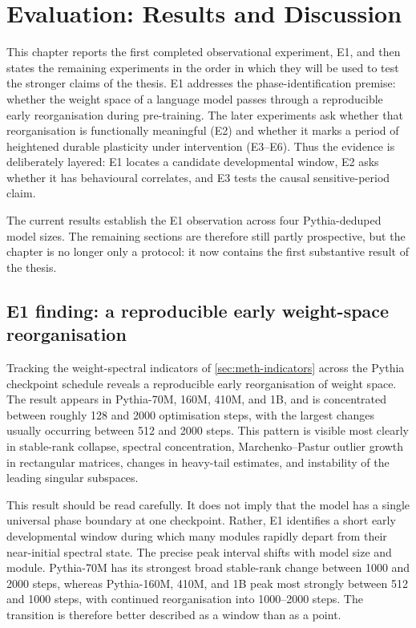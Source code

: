 \chapter{Evaluation: Results and Discussion}
\label{ch:results}

This chapter reports the first completed observational experiment, E1, and then states the
remaining experiments in the order in which they will be used to test the stronger claims of the
thesis. E1 addresses the phase-identification premise: whether the weight space of a language
model passes through a reproducible early reorganisation during pre-training. The later experiments
ask whether that reorganisation is functionally meaningful (E2) and whether it marks a period of
heightened durable plasticity under intervention (E3--E6). Thus the evidence is deliberately
layered: E1 locates a candidate developmental window, E2 asks whether it has behavioural
correlates, and E3 tests the causal sensitive-period claim.

The current results establish the E1 observation across four Pythia-deduped model sizes. The
remaining sections are therefore still partly prospective, but the chapter is no longer only a
protocol: it now contains the first substantive result of the thesis.

\section{E1 finding: a reproducible early weight-space reorganisation}
\label{sec:res-prelim}

Tracking the weight-spectral indicators of \cref{sec:meth-indicators} across the Pythia checkpoint
schedule reveals a reproducible early reorganisation of weight space. The result appears in
Pythia-70M, 160M, 410M, and 1B, and is concentrated between roughly 128 and 2000 optimisation steps,
with the largest changes usually occurring between 512 and 2000 steps. This pattern is visible most
clearly in stable-rank collapse, spectral concentration, Marchenko--Pastur outlier growth in
rectangular matrices, changes in heavy-tail estimates, and instability of the leading singular
subspaces.

This result should be read carefully. It does not imply that the model has a single universal phase
boundary at one checkpoint. Rather, E1 identifies a short early developmental window during which
many modules rapidly depart from their near-initial spectral state. The precise peak interval shifts
with model size and module. Pythia-70M has its strongest broad stable-rank change between 1000 and
2000 steps, whereas Pythia-160M, 410M, and 1B peak most strongly between 512 and 1000 steps, with
continued reorganisation into 1000--2000 steps. The transition is therefore better described as a
window than as a point.

